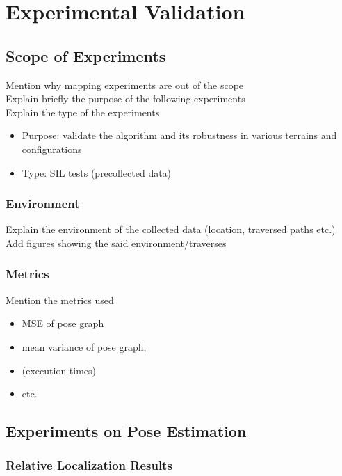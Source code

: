 \label{Chapter4}

\chapter{Experimental Validation}

\section{Scope of Experiments}

Mention why mapping experiments are out of the scope\\
Explain briefly the purpose of the following experiments\\
Explain the type of the experiments

\begin{itemize}
    \item Purpose: validate the algorithm and its robustness in various terrains and configurations
    \item Type: SIL tests (precollected data)
\end{itemize}

\subsection{Environment}

Explain the environment of the collected data (location, traversed paths etc.)\\
Add figures showing the said environment/traverses

\subsection{Metrics}

Mention the metrics used

\begin{itemize}
    \item MSE of pose graph
    \item mean variance of pose graph,
    \item (execution times)
    \item etc.
\end{itemize}

\section{Experiments on Pose Estimation}

\subsection{Relative Localization Results}


